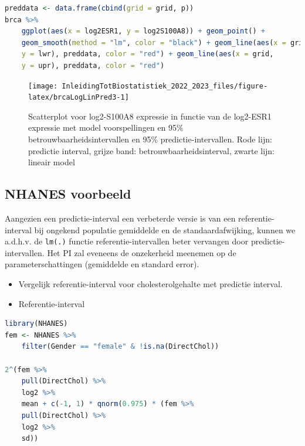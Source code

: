 \documentclass[
  12pt,dutch,coursenotes]{book}
\newcommand{\passthrough}[1]{#1}
\begin{document}
\begin{lstlisting}[language=R]
preddata <- data.frame(cbind(grid = grid, p))
brca %>%
    ggplot(aes(x = log2ESR1, y = log2S100A8)) + geom_point() +
    geom_smooth(method = "lm", color = "black") + geom_line(aes(x = grid,
    y = lwr), preddata, color = "red") + geom_line(aes(x = grid,
    y = upr), preddata, color = "red")
\end{lstlisting}

\begin{figure}

{\centering \texttt{[image: InleidingTotBiostatistiek\_2022\_2023\_files/figure-latex/brcaLogLinPred3-1]} 

}

\caption{Scatterplot voor log2-S100A8 expressie in functie van de log2-ESR1 expressie met model voorspellingen en 95$\%$ betrouwbaarheidsintervallen en 95$\%$ predictie-intervallen. Rode lijn: predictie interval, grijze band: betrouwbaarheidsinterval, zwarte lijn: lineair model}\label{fig:brcaLogLinPred3}
\end{figure}

\hypertarget{nhanes-voorbeeld}{%
\subsection{NHANES voorbeeld}\label{nhanes-voorbeeld}}

Aangezien een predictie-interval een verbeterde versie is van een referentie-interval bij ongekend populatie gemiddelde en de standaardafwijking, kunnen we a.d.h.v. de \passthrough{\lstinline!lm(.)!} functie referentie-intervallen beter vervangen door predictie-intervallen.
Het PI zal eveneens de onzekerheid meenemen op de parameterschattingen (gemiddelde en standard error).

\begin{itemize}
\item
  Vergelijk referentie-interval voor cholesterolgehalte met predictie interval.
\item
  Referentie-interval
\end{itemize}

\begin{lstlisting}[language=R]
library(NHANES)
fem <- NHANES %>%
    filter(Gender == "female" & !is.na(DirectChol))

2^(fem %>%
    pull(DirectChol) %>%
    log2 %>%
    mean + c(-1, 1) * qnorm(0.975) * (fem %>%
    pull(DirectChol) %>%
    log2 %>%
    sd))
\end{lstlisting}
\end{document}
